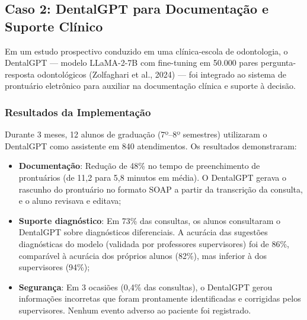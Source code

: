 \subsection{Caso 2: DentalGPT para Documentação e Suporte Clínico}

Em um estudo prospectivo conduzido em uma clínica-escola de odontologia, o DentalGPT --- modelo LLaMA-2-7B com fine-tuning em 50.000 pares pergunta-resposta odontológicos (Zolfaghari et al., 2024) --- foi integrado ao sistema de prontuário eletrônico para auxiliar na documentação clínica e suporte à decisão.

\subsubsection{Resultados da Implementação}

Durante 3 meses, 12 alunos de graduação (7º--8º semestres) utilizaram o DentalGPT como assistente em 840 atendimentos. Os resultados demonstraram:

\begin{itemize}
    \item \textbf{Documentação}: Redução de 48\% no tempo de preenchimento de prontuários (de 11,2 para 5,8 minutos em média). O DentalGPT gerava o rascunho do prontuário no formato SOAP a partir da transcrição da consulta, e o aluno revisava e editava;

    \item \textbf{Suporte diagnóstico}: Em 73\% das consultas, os alunos consultaram o DentalGPT sobre diagnósticos diferenciais. A acurácia das sugestões diagnósticas do modelo (validada por professores supervisores) foi de 86\%, comparável à acurácia dos próprios alunos (82\%), mas inferior à dos supervisores (94\%);

    \item \textbf{Segurança}: Em 3 ocasiões (0,4\% das consultas), o DentalGPT gerou informações incorretas que foram prontamente identificadas e corrigidas pelos supervisores. Nenhum evento adverso ao paciente foi registrado.
\end{itemize}


